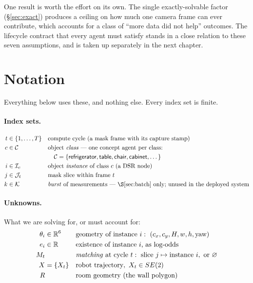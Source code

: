 \documentclass[11pt,a4paper]{report}
\newcommand{\R}{\mathbb{R}}
\theoremstyle{definition}   %
\begin{document}
\medskip\noindent
One result is worth the effort on its own. The single exactly-solvable factor
(\S\ref{sec:exact}) produces a ceiling on how much one camera frame can ever contribute, which
accounts for a class of ``more data did not help'' outcomes. The lifecycle contract that every
agent must satisfy stands in a close relation to these seven assumptions, and is taken up
separately in the next chapter.

\section{Notation}
\label{sec:notation}

Everything below uses these, and nothing else. Every index set is finite.

\paragraph{Index sets.}
\begin{align*}
t &\in \{1,\dots,T\}    && \text{compute cycle (a mask frame with its capture stamp)}\\
c &\in \mathcal{C}       && \text{object \emph{class} — one concept agent per class:}\\
  &                      && \quad \mathcal{C}=\{\textsf{refrigerator},\textsf{table},\textsf{chair},\textsf{cabinet},\dots\}\\
i &\in \mathcal{I}_c     && \text{object \emph{instance} of class }c\text{ (a DSR node)}\\
j &\in \mathcal{J}_t     && \text{mask slice within frame }t\\
k &\in \mathcal{K}       && \text{\emph{burst} of measurements — \S\ref{sec:batch} only; unused in the deployed system}
\end{align*}

\paragraph{Unknowns.} What we are solving for, or must account for:
\begin{align*}
\theta_i &\in \R^{6}   && \text{geometry of instance }i:\ (c_x,c_y,H,w,h,\text{yaw})\\
e_i      &\in \R       && \text{existence of instance }i\text{, as log-odds}\\
M_t      &             && \text{\emph{matching} at cycle }t:\ \text{slice } j \mapsto \text{instance } i,\ \text{or } \varnothing\\
X        &=\{X_t\}     && \text{robot trajectory},\ X_t\in SE(2)\\
R        &             && \text{room geometry (the wall polygon)}
\end{align*}
\end{document}
